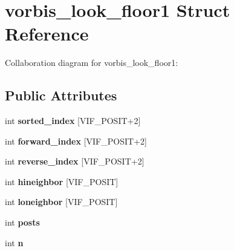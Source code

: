 \hypertarget{structvorbis__look__floor1}{\section{vorbis\+\_\+look\+\_\+floor1 Struct Reference}
\label{structvorbis__look__floor1}
}


Collaboration diagram for vorbis\+\_\+look\+\_\+floor1\+:
\subsection*{Public Attributes}
\begin{DoxyCompactItemize}
\item 
\hypertarget{structvorbis__look__floor1_a629f0bee40a5c9a8f644e7df69f3dadb}{int {\bfseries sorted\+\_\+index} \mbox{[}V\+I\+F\+\_\+\+P\+O\+S\+I\+T+2\mbox{]}}\label{structvorbis__look__floor1_a629f0bee40a5c9a8f644e7df69f3dadb}

\item 
\hypertarget{structvorbis__look__floor1_aef7094d8e6608a42938cf39a0f5373ab}{int {\bfseries forward\+\_\+index} \mbox{[}V\+I\+F\+\_\+\+P\+O\+S\+I\+T+2\mbox{]}}\label{structvorbis__look__floor1_aef7094d8e6608a42938cf39a0f5373ab}

\item 
\hypertarget{structvorbis__look__floor1_a6743f31bc487a907f36876a98a5bf0ec}{int {\bfseries reverse\+\_\+index} \mbox{[}V\+I\+F\+\_\+\+P\+O\+S\+I\+T+2\mbox{]}}\label{structvorbis__look__floor1_a6743f31bc487a907f36876a98a5bf0ec}

\item 
\hypertarget{structvorbis__look__floor1_a81fcfd46dab832da0709459a76aa80e2}{int {\bfseries hineighbor} \mbox{[}V\+I\+F\+\_\+\+P\+O\+S\+I\+T\mbox{]}}\label{structvorbis__look__floor1_a81fcfd46dab832da0709459a76aa80e2}

\item 
\hypertarget{structvorbis__look__floor1_ae5d2a437f26594d0b254b3b7c802377d}{int {\bfseries loneighbor} \mbox{[}V\+I\+F\+\_\+\+P\+O\+S\+I\+T\mbox{]}}\label{structvorbis__look__floor1_ae5d2a437f26594d0b254b3b7c802377d}

\item 
\hypertarget{structvorbis__look__floor1_ad6b1755af6760f3236c1f937c4c50edc}{int {\bfseries posts}}\label{structvorbis__look__floor1_ad6b1755af6760f3236c1f937c4c50edc}

\item 
\hypertarget{structvorbis__look__floor1_ae51b0aedc2263f6f31d44299c283ab52}{int {\bfseries n}}\label{structvorbis__look__floor1_ae51b0aedc2263f6f31d44299c283ab52}


\end{DoxyCompactItemize}
